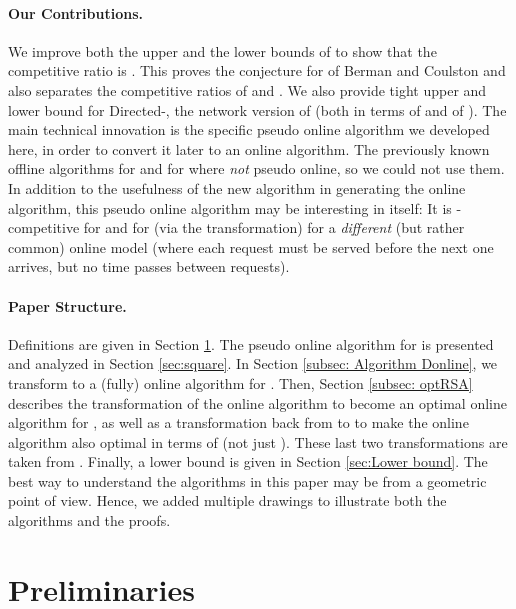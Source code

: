 \documentclass[11pt]{article}
\begin{document}
\paragraph*{Our Contributions.}
We improve both the upper and the lower bounds of   to show that the competitive ratio is .
This proves the conjecture for  of  Berman and Coulston  \cite{berman} and also separates the competitive ratios of  and .
We also provide tight upper and lower bound for Directed-, the network version of  (both in terms of   and of ).
The main technical innovation is the specific pseudo online algorithm we developed here,
in order to convert it later to an online algorithm.
The previously known offline algorithms for  and for  where {\em not} pseudo online, so we could not use them.
In addition to the usefulness of the new algorithm in generating the online algorithm, this pseudo online algorithm may be interesting in itself:
It is -competitive for  and for  (via the transformation)
for a {\em different} (but rather common) online model (where
each request must be served before the next one arrives, but no time passes between requests).






\paragraph*{Paper Structure.}
Definitions are given in Section \ref{Sec:preliminaries}.
The pseudo online algorithm  for  is presented and analyzed in Section \ref{sec:square}.
In Section \ref{subsec: Algorithm Donline}, we transform  to a (fully) online algorithm   for .
Then, Section \ref{subsec: optRSA} describes the transformation of the online  algorithm   to become an optimal online algorithm for , as well as a transformation back from  to  to make the  online algorithm also optimal in terms of  (not just ).
These last two transformations are taken from \cite{KK2014}. Finally, a lower bound is given in Section \ref{sec:Lower bound}.
The best way to understand the algorithms in this paper may be from a geometric point of view.
Hence, we added multiple drawings
to illustrate both the algorithms and the proofs.




\vspace{-0.3cm}
\section{Preliminaries}
\label{Sec:preliminaries}
\label{sec:preliminaries}
\end{document}
